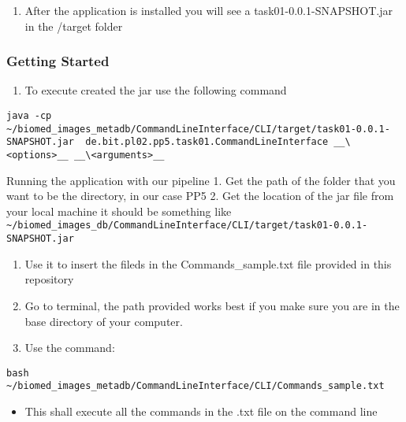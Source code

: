 \begin{enumerate}
\def\labelenumi{\arabic{enumi}.}
\setcounter{enumi}{2}
\tightlist
\item
  After the application is installed you will see a
  task01-0.0.1-SNAPSHOT.jar in the /target folder
\end{enumerate}

\hypertarget{getting-started}{%
\subsubsection{Getting Started}\label{getting-started}}

\begin{enumerate}
\def\labelenumi{\arabic{enumi}.}
\tightlist
\item
  To execute created the jar use the following command
\end{enumerate}

\begin{verbatim}
java -cp ~/biomed_images_metadb/CommandLineInterface/CLI/target/task01-0.0.1-SNAPSHOT.jar  de.bit.pl02.pp5.task01.CommandLineInterface __\<options>__ __\<arguments>__ 
\end{verbatim}

Running the application with our pipeline 1. Get the path of the folder
that you want to be the directory, in our case PP5 2. Get the location
of the jar file from your local machine it should be something like
\texttt{\textasciitilde{}/biomed\_images\_db/CommandLineInterface/CLI/target/task01-0.0.1-SNAPSHOT.jar}

\begin{enumerate}
\def\labelenumi{\arabic{enumi}.}
\setcounter{enumi}{2}
\tightlist
\item
  Use it to insert the fileds in the Commands\_sample.txt file provided
  in this repository
\item
  Go to terminal, the path provided works best if you make sure you are
  in the base directory of your computer.
\item
  Use the command:
\end{enumerate}

\begin{verbatim}
bash ~/biomed_images_metadb/CommandLineInterface/CLI/Commands_sample.txt 
\end{verbatim}

\begin{itemize}
\tightlist
\item
  This shall execute all the commands in the .txt file on the command
  line
\end{itemize}

